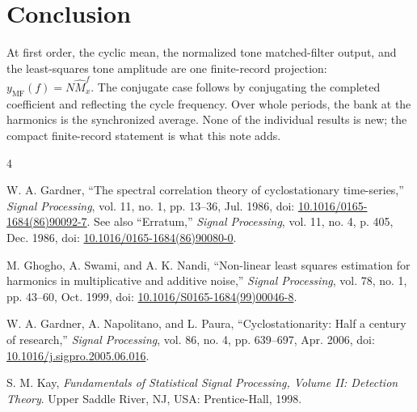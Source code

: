 \documentclass[11pt,draftcls,onecolumn,journal]{IEEEtran}
\begin{document}
\section*{Conclusion}

At first order, the cyclic mean, the normalized tone matched-filter output, and the least-squares tone amplitude are one finite-record projection: $y_{\mathrm{MF}}(f)=N\widehat M_x^f$.  The conjugate case follows by conjugating the completed coefficient and reflecting the cycle frequency.  Over whole periods, the bank at the harmonics is the synchronized average.  None of the individual results is new; the compact finite-record statement is what this note adds.


\begin{thebibliography}{4}

W. A. Gardner, ``The spectral correlation theory of cyclostationary time-series,''
\emph{Signal Processing}, vol. 11, no. 1, pp. 13--36, Jul. 1986,
doi: \href{https://doi.org/10.1016/0165-1684(86)90092-7}{10.1016/0165-1684(86)90092-7}.
See also ``Erratum,'' \emph{Signal Processing}, vol. 11, no. 4, p. 405, Dec. 1986,
doi: \href{https://doi.org/10.1016/0165-1684(86)90080-0}{10.1016/0165-1684(86)90080-0}.

M. Ghogho, A. Swami, and A. K. Nandi,
``Non-linear least squares estimation for harmonics in multiplicative and additive noise,''
\emph{Signal Processing}, vol. 78, no. 1, pp. 43--60, Oct. 1999,
doi: \href{https://doi.org/10.1016/S0165-1684(99)00046-8}{10.1016/S0165-1684(99)00046-8}.

W. A. Gardner, A. Napolitano, and L. Paura, ``Cyclostationarity: Half a century of research,''
\emph{Signal Processing}, vol. 86, no. 4, pp. 639--697, Apr. 2006,
doi: \href{https://doi.org/10.1016/j.sigpro.2005.06.016}{10.1016/j.sigpro.2005.06.016}.

S. M. Kay, \emph{Fundamentals of Statistical Signal Processing, Volume II: Detection Theory}.
Upper Saddle River, NJ, USA: Prentice-Hall, 1998.

\end{thebibliography}
\end{document}

